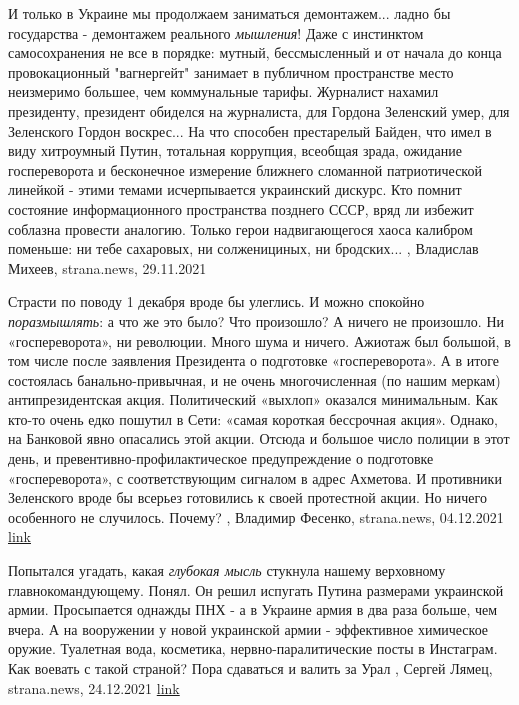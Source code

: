 И только в Украине мы продолжаем заниматься демонтажем... ладно бы государства
- демонтажем реального \emph{мышления}!  Даже с инстинктом самосохранения не
все в порядке: мутный, бессмысленный и от начала до конца провокационный
"вагнергейт" занимает в публичном пространстве место неизмеримо большее, чем
коммунальные тарифы.  Журналист нахамил президенту, президент обиделся на
журналиста, для Гордона Зеленский умер, для Зеленского Гордон воскрес...  На
что способен престарелый Байден, что имел в виду хитроумный Путин, тотальная
коррупция, всеобщая зрада, ожидание госпереворота и бесконечное измерение
ближнего сломанной патриотической линейкой - этими темами исчерпывается
украинский дискурс.  Кто помнит состояние информационного пространства позднего
СССР, вряд ли избежит соблазна провести аналогию.  Только герои надвигающегося
хаоса калибром поменьше: ни тебе сахаровых, ни солженициных, ни бродских...
, 
Владислав Михеев, strana.news, 29.11.2021

Страсти по поводу 1 декабря вроде бы улеглись. И можно спокойно
\emph{поразмышлять}: а что же это было? Что произошло? А ничего не произошло.
Ни «госпереворота», ни революции. Много шума и ничего. Ажиотаж был большой, в
том числе после заявления Президента о подготовке «госпереворота». А в итоге
состоялась банально-привычная, и не очень многочисленная (по нашим меркам)
антипрезидентская акция. Политический «выхлоп» оказался минимальным. Как кто-то
очень едко пошутил в Сети: «самая короткая бессрочная акция».  Однако, на
Банковой явно опасались этой акции. Отсюда и большое число полиции в этот день,
и превентивно-профилактическое предупреждение о подготовке «госпереворота», с
соответствующим сигналом в адрес Ахметова. И противники Зеленского вроде бы
всерьез готовились к своей протестной акции. Но ничего особенного не случилось.
Почему?
, 
Владимир Фесенко, strana.news, 04.12.2021
\href{https://strana.news/opinions/365396-revoljutsii-i-hosperevoroty-po-anonsu-nikohda-ne-nachinajutsja.html}{link}

Попытался угадать, какая \emph{глубокая мысль} стукнула нашему верховному
главнокомандующему.  Понял. Он решил испугать Путина размерами украинской
армии. Просыпается однажды ПНХ - а в Украине армия в два раза больше, чем
вчера. А на вооружении у новой украинской армии - эффективное химическое
оружие. Туалетная вода, косметика, нервно-паралитические посты в Инстаграм.
Как воевать с такой страной? Пора сдаваться и валить за Урал
, 
Сергей Лямец, strana.news, 24.12.2021
\href{https://strana.news/opinions/368623-nash-verkhovnyj-hlavnokomandujushchij-reshil-ispuhat-putina-zhenshchinami.html}{link}

